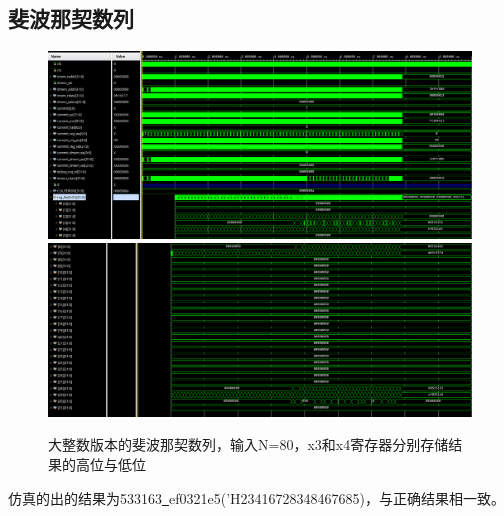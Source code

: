 \documentclass[12pt,a4paper]{ctexart}
\begin{document}
\subsection{斐波那契数列}
\begin{figure}[H]
    \centering
    \includegraphics[scale=0.35]{pic/1.png}
    \includegraphics[scale=0.35]{pic/2.png}
    \caption{大整数版本的斐波那契数列，输入N=80，x3和x4寄存器分别存储结果的高位与低位}
\end{figure}
仿真的出的结果为533163\underline{~}ef0321e5('H23416728348467685)，与正确结果相一致。
\end{document}

